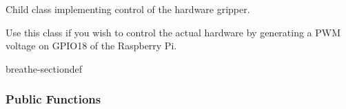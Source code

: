 \documentclass[letterpaper,10pt,english]{sphinxmanual}
\begin{document}
\begin{fulllineitems}
\label{\detokenize{code/bioscara_hardware_drivers/index:_CPPv4N25bioscara_hardware_drivers25bioscara_hardware_drivers7GripperE}}\label{\detokenize{code/bioscara_hardware_drivers/index:_CPPv3N25bioscara_hardware_drivers25bioscara_hardware_drivers7GripperE}}\label{\detokenize{code/bioscara_hardware_drivers/index:_CPPv2N25bioscara_hardware_drivers25bioscara_hardware_drivers7GripperE}}\label{\detokenize{code/bioscara_hardware_drivers/index:bioscara_hardware_drivers::bioscara_hardware_drivers::Gripper}}
\pysigstartsignatures
\pysigstartmultiline
\pysigline
{\label{\detokenize{code/bioscara_hardware_drivers/index:classbioscara__hardware__drivers_1_1Gripper}}}
\pysigstopmultiline
\pysigstopsignatures{}
\sphinxAtStartPar
Child class implementing control of the hardware gripper. 

\sphinxAtStartPar
Use this class if you wish to control the actual hardware by generating a PWM voltage on GPIO18 of the Raspberry Pi. 

\begin{sphinxuseclass}{breathe-sectiondef}\subsubsection*{Public Functions}


\end{sphinxuseclass}
\end{fulllineitems}
\end{document}
